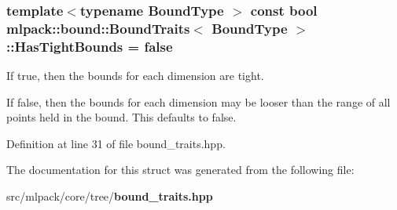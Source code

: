 \subsubsection[{Has\+Tight\+Bounds}]{\setlength{\rightskip}{0pt plus 5cm}template$<$typename Bound\+Type $>$ const bool {\bf mlpack\+::bound\+::\+Bound\+Traits}$<$ Bound\+Type $>$\+::Has\+Tight\+Bounds = false\hspace{0.3cm}{\ttfamily [static]}}\label{structmlpack_1_1bound_1_1BoundTraits_acca795f944f0166f546e05d95c5c2b46}


If true, then the bounds for each dimension are tight. 

If false, then the bounds for each dimension may be looser than the range of all points held in the bound. This defaults to false. 

Definition at line 31 of file bound\+\_\+traits.\+hpp.



The documentation for this struct was generated from the following file\+:\begin{DoxyCompactItemize}
\item 
src/mlpack/core/tree/{\bf bound\+\_\+traits.\+hpp}\end{DoxyCompactItemize}

